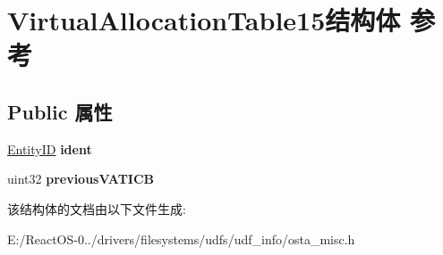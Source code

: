 \hypertarget{struct_virtual_allocation_table15}{}\section{Virtual\+Allocation\+Table15结构体 参考}
\label{struct_virtual_allocation_table15}
\subsection*{Public 属性}
\begin{DoxyCompactItemize}
\item 
\mbox{\label{struct_virtual_allocation_table15_ac9ed66945da06f53b2a05be81866c7e2}} 
\hyperlink{struct_entity_i_d}{Entity\+ID} {\bfseries ident}
\item 
\mbox{\label{struct_virtual_allocation_table15_af6f685a9b43f586714f52929e6a73018}} 
uint32 {\bfseries previous\+V\+A\+T\+I\+CB}
\end{DoxyCompactItemize}


该结构体的文档由以下文件生成\+:\begin{DoxyCompactItemize}
\item 
E\+:/\+React\+O\+S-\/0../drivers/filesystems/udfs/udf\+\_\+info/osta\+\_\+misc.\+h\end{DoxyCompactItemize}
